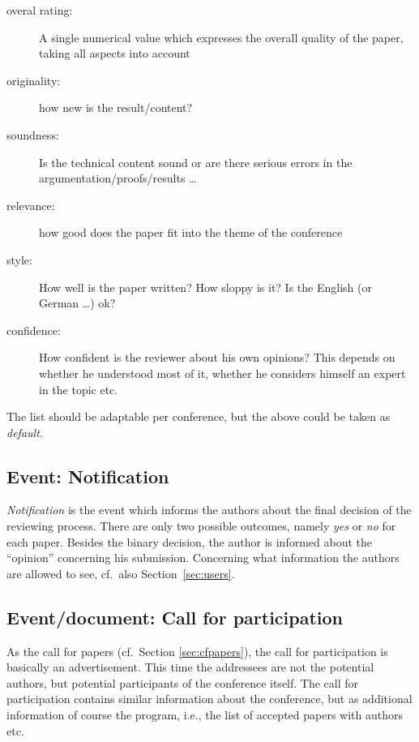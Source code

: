 \begin{description}
\item[overal rating:] A single numerical value which expresses the overall
  quality of the paper, taking all aspects into account
\item[originality:] how new is the result/content?
\item[soundness:] Is the technical content sound or are there serious
  errors in the argumentation/proofs/results \ldots
\item[relevance:] how good does the paper fit into the theme of the conference
\item[style:] How well is the paper written? How sloppy is it? Is the
  English (or German \ldots) ok?
\item[confidence:] How confident is the reviewer about his own opinions?
  This depends on whether he understood most of it, whether he considers
  himself an expert in the topic etc.
\end{description}

The list should be adaptable per conference, but the above could be taken
as \emph{default.}





\subsection{Event: Notification}
\label{sec:notification}


\emph{Notification} is the event which informs the authors about the final
decision of the reviewing process. There are only two possible outcomes,
namely \emph{yes} or \emph{no} for each paper. Besides the binary decision,
the author is informed about the ``opinion'' concerning his submission.
Concerning what information the authors are allowed to see, cf.\ also
Section~\ref{sec:users}.

\subsection{Event/document: Call for participation}
\label{sec:cfparticipation}%

As the call for papers (cf.\ Section \ref{sec:cfpapers}), the call for
participation is basically an advertisement. This time the addressees are
not the potential authors, but potential participants of the conference
itself. The call for participation contains similar information about the
conference, but as additional information of course the program, i.e.,
the list of accepted papers with authors etc.






